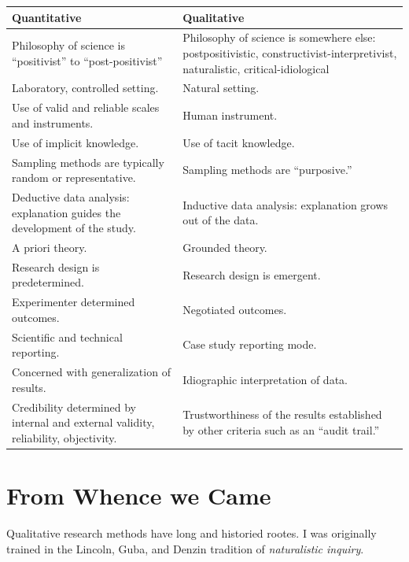 \documentclass[
  english,
]{book}
\begin{document}
\begin{longtable}[]{@{}
  >{\raggedright\arraybackslash}p{}
  >{\raggedright\arraybackslash}p{}@{}}
\toprule
\textbf{Quantitative} & \textbf{Qualitative} \\
\midrule
\endhead
Philosophy of science is ``positivist'' to ``post-positivist'' & Philosophy of science is somewhere else: postpositivistic, constructivist-interpretivist, naturalistic, critical-idiological \\
Laboratory, controlled setting. & Natural setting. \\
Use of valid and reliable scales and instruments. & Human instrument. \\
Use of implicit knowledge. & Use of tacit knowledge. \\
Sampling methods are typically random or representative. & Sampling methods are ``purposive.'' \\
Deductive data analysis: explanation guides the development of the study. & Inductive data analysis: explanation grows out of the data. \\
A priori theory. & Grounded theory. \\
Research design is predetermined. & Research design is emergent. \\
Experimenter determined outcomes. & Negotiated outcomes. \\
Scientific and technical reporting. & Case study reporting mode. \\
Concerned with generalization of results. & Idiographic interpretation of data. \\
Credibility determined by internal and external validity, reliability, objectivity. & Trustworthiness of the results established by other criteria such as an ``audit trail.'' \\
\bottomrule
\end{longtable}

\hypertarget{from-whence-we-came}{%
\section{From Whence we Came}\label{from-whence-we-came}}

Qualitative research methods have long and historied rootes. I was originally trained in the Lincoln, Guba, and Denzin tradition of \emph{naturalistic inquiry}.
\end{document}
